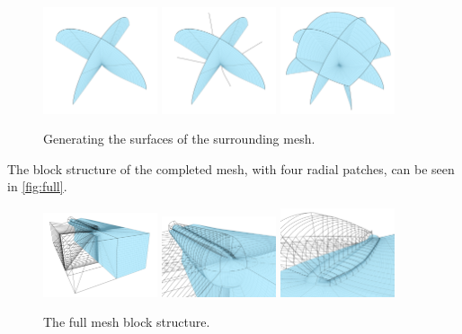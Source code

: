 \documentclass[3p,times,procedia]{elsarticle}
\begin{document}
\begin{figure}
  \centering
  \includegraphics[width=0.3\textwidth]{figs/wingtip-first}
  \includegraphics[width=0.3\textwidth]{figs/wingtip-centers}
  \includegraphics[width=0.3\textwidth]{figs/wingtip-flower}
  \caption{Generating the surfaces of the surrounding mesh.}
  \label{fig:flower}
\end{figure}

The block structure of the completed mesh, with four radial patches, can be seen
in \autoref{fig:full}.

\begin{figure}
  \centering
  \includegraphics[width=0.3\textwidth]{figs/block-1}
  \includegraphics[width=0.3\textwidth]{figs/block-2}
  \includegraphics[width=0.3\textwidth]{figs/block-3}
  \caption{The full mesh block structure.}
  \label{fig:full}
\end{figure}
\end{document}
